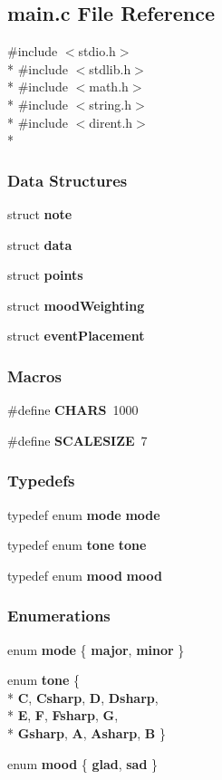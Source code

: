\subsection{main.\+c File Reference}
\label{main_8c}
{\ttfamily \#include $<$stdio.\+h$>$}\\*
{\ttfamily \#include $<$stdlib.\+h$>$}\\*
{\ttfamily \#include $<$math.\+h$>$}\\*
{\ttfamily \#include $<$string.\+h$>$}\\*
{\ttfamily \#include $<$dirent.\+h$>$}\\*
\subsubsection*{Data Structures}
\begin{DoxyCompactItemize}
\item 
struct {\bf note}
\item 
struct {\bf data}
\item 
struct {\bf points}
\item 
struct {\bf mood\+Weighting}
\item 
struct {\bf event\+Placement}
\end{DoxyCompactItemize}
\subsubsection*{Macros}
\begin{DoxyCompactItemize}
\item 
\#define {\bf C\+H\+A\+R\+S}~1000
\item 
\#define {\bf S\+C\+A\+L\+E\+S\+I\+Z\+E}~7
\end{DoxyCompactItemize}
\subsubsection*{Typedefs}
\begin{DoxyCompactItemize}
\item 
typedef enum {\bf mode} {\bf mode}
\item 
typedef enum {\bf tone} {\bf tone}
\item 
typedef enum {\bf mood} {\bf mood}
\end{DoxyCompactItemize}
\subsubsection*{Enumerations}
\begin{DoxyCompactItemize}
\item 
enum {\bf mode} \{ {\bf major}, 
{\bf minor}
 \}
\item 
enum {\bf tone} \{ \\*
{\bf C}, 
{\bf Csharp}, 
{\bf D}, 
{\bf Dsharp}, 
\\*
{\bf E}, 
{\bf F}, 
{\bf Fsharp}, 
{\bf G}, 
\\*
{\bf Gsharp}, 
{\bf A}, 
{\bf Asharp}, 
{\bf B}
 \}
\item 
enum {\bf mood} \{ {\bf glad}, 
{\bf sad}
 \}
\end{DoxyCompactItemize}
